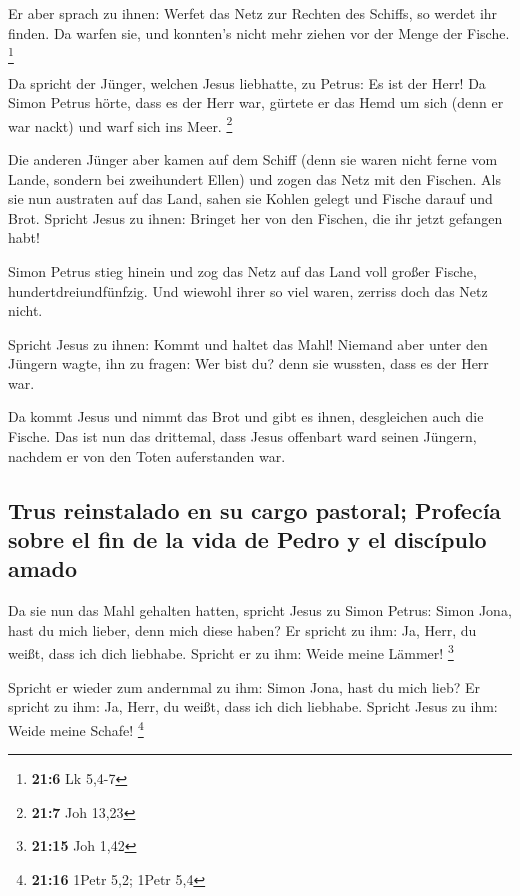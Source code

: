  Er aber sprach zu ihnen: Werfet das Netz zur Rechten des
Schiffs, so werdet ihr finden. Da warfen sie, und konnten's nicht mehr
ziehen vor der Menge der Fische. \footnote{\textbf{21:6} Lk 5,4-7}

 Da spricht der Jünger, welchen Jesus liebhatte, zu
Petrus: Es ist der Herr! Da Simon Petrus hörte, dass es der Herr war,
gürtete er das Hemd um sich (denn er war nackt) und warf sich ins Meer.
\footnote{\textbf{21:7} Joh 13,23}

 Die anderen Jünger aber kamen auf dem Schiff (denn sie
waren nicht ferne vom Lande, sondern bei zweihundert Ellen) und zogen
das Netz mit den Fischen.  Als sie nun austraten auf das
Land, sahen sie Kohlen gelegt und Fische darauf und Brot.
 Spricht Jesus zu ihnen: Bringet her von den Fischen, die
ihr jetzt gefangen habt!

 Simon Petrus stieg hinein und zog das Netz auf das Land
voll großer Fische, hundertdreiundfünfzig. Und wiewohl ihrer so viel
waren, zerriss doch das Netz nicht.

 Spricht Jesus zu ihnen: Kommt und haltet das Mahl!
Niemand aber unter den Jüngern wagte, ihn zu fragen: Wer bist du? denn
sie wussten, dass es der Herr war.

 Da kommt Jesus und nimmt das Brot und gibt es ihnen,
desgleichen auch die Fische.  Das ist nun das drittemal,
dass Jesus offenbart ward seinen Jüngern, nachdem er von den Toten
auferstanden war.

\hypertarget{trus-reinstalado-en-su-cargo-pastoral-profecuxeda-sobre-el-fin-de-la-vida-de-pedro-y-el-discuxedpulo-amado}{%
\subsection{Trus reinstalado en su cargo pastoral; Profecía sobre el fin
de la vida de Pedro y el discípulo
amado}\label{trus-reinstalado-en-su-cargo-pastoral-profecuxeda-sobre-el-fin-de-la-vida-de-pedro-y-el-discuxedpulo-amado}}

 Da sie nun das Mahl gehalten hatten, spricht Jesus zu
Simon Petrus: Simon Jona, hast du mich lieber, denn mich diese haben? Er
spricht zu ihm: Ja, Herr, du weißt, dass ich dich liebhabe. Spricht er
zu ihm: Weide meine Lämmer! \footnote{\textbf{21:15} Joh 1,42}

 Spricht er wieder zum andernmal zu ihm: Simon Jona, hast
du mich lieb? Er spricht zu ihm: Ja, Herr, du weißt, dass ich dich
liebhabe. Spricht Jesus zu ihm: Weide meine Schafe! \footnote{\textbf{21:16}
  1Petr 5,2; 1Petr 5,4}

